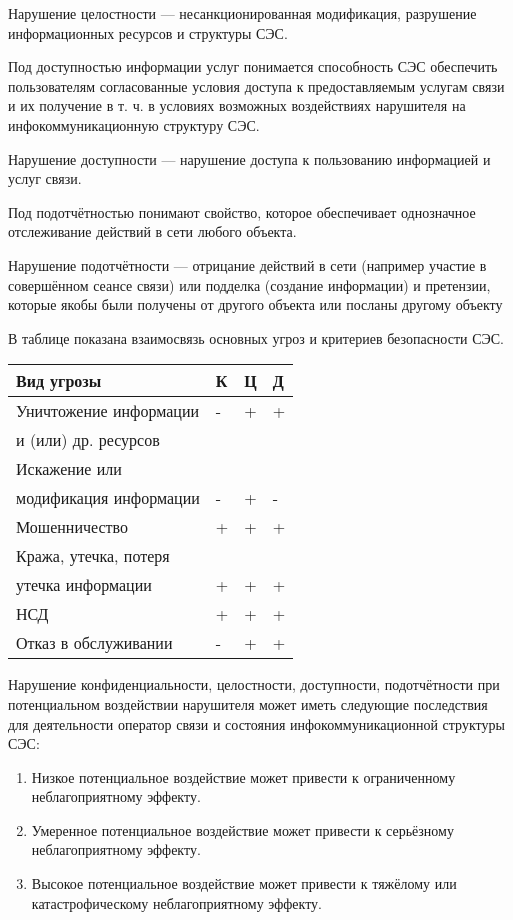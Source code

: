 \documentclass[12pt, russian, oneside, article]{ncc}
\begin{document}
Нарушение целостности --- несанкционированная модификация, разрушение информационных ресурсов и структуры СЭС.

Под доступностью информации услуг понимается способность СЭС обеспечить пользователям согласованные условия доступа к предоставляемым услугам связи и их получение в т. ч. в условиях возможных воздействиях нарушителя на инфокоммуникационную структуру СЭС.

Нарушение доступности --- нарушение доступа к пользованию информацией и услуг связи.

Под подотчётностью понимают свойство, которое обеспечивает однозначное отслеживание действий в сети любого объекта.

Нарушение подотчётности --- отрицание действий в сети (например участие в совершённом сеансе связи) или подделка (создание информации) и претензии, которые якобы были получены от другого объекта или посланы другому объекту

В таблице показана взаимосвязь основных угроз и критериев безопасности СЭС.



\begin{center}
\begin{tabular}{llll}
 Вид угрозы              &  К  &  Ц  &  Д  \\
\hline
 Уничтожение информации  &  -  &  +  &  +  \\
 и (или) др. ресурсов    &     &     &     \\
\hline
 Искажение или           &     &     &     \\
 модификация информации  &  -  &  +  &  -  \\
\hline
 Мошенничество           &  +  &  +  &  +  \\
\hline
 Кража, утечка, потеря   &     &     &     \\
 утечка информации       &  +  &  +  &  +  \\
\hline
 НСД                     &  +  &  +  &  +  \\
\hline
 Отказ в обслуживании    &  -  &  +  &  +  \\
\end{tabular}
\end{center}



Нарушение конфиденциальности, целостности, доступности, подотчётности при потенциальном воздействии нарушителя может иметь следующие последствия для деятельности оператор связи и состояния инфокоммуникационной структуры СЭС:
\begin{enumerate}
\item Низкое потенциальное воздействие может привести к ограниченному неблагоприятному эффекту.
\item Умеренное потенциальное воздействие может привести к серьёзному неблагоприятному эффекту.
\item Высокое потенциальное воздействие может привести к тяжёлому или катастрофическому неблагоприятному эффекту.
\end{enumerate}
\end{document}
